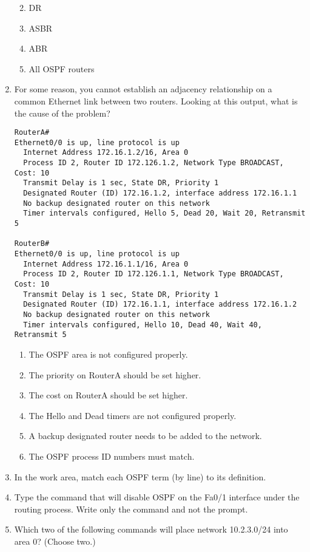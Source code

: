 \begin{enumerate}
  \begin{enumerate}
  \def\labelenumii{\Alph{enumii}.}
  \tightlist
  \item
    DR
  \item
    ASBR
  \item
    \protect\hypertarget{c18.xhtmlux5cux23Page_779}{}{}ABR
  \item
    All OSPF routers
  \end{enumerate}
\item
  For some reason, you cannot establish an adjacency relationship on a
  common Ethernet link between two routers. Looking at this output, what
  is the cause of the problem?

\begin{verbatim}
RouterA#
Ethernet0/0 is up, line protocol is up
  Internet Address 172.16.1.2/16, Area 0
  Process ID 2, Router ID 172.126.1.2, Network Type BROADCAST, Cost: 10
  Transmit Delay is 1 sec, State DR, Priority 1
  Designated Router (ID) 172.16.1.2, interface address 172.16.1.1
  No backup designated router on this network
  Timer intervals configured, Hello 5, Dead 20, Wait 20, Retransmit 5
 
RouterB#
Ethernet0/0 is up, line protocol is up
  Internet Address 172.16.1.1/16, Area 0
  Process ID 2, Router ID 172.126.1.1, Network Type BROADCAST, Cost: 10
  Transmit Delay is 1 sec, State DR, Priority 1
  Designated Router (ID) 172.16.1.1, interface address 172.16.1.2
  No backup designated router on this network
  Timer intervals configured, Hello 10, Dead 40, Wait 40, Retransmit 5
\end{verbatim}

  \begin{enumerate}
  \def\labelenumii{\Alph{enumii}.}
  \tightlist
  \item
    The OSPF area is not configured properly.
  \item
    The priority on RouterA should be set higher.
  \item
    The cost on RouterA should be set higher.
  \item
    The Hello and Dead timers are not configured properly.
  \item
    A backup designated router needs to be added to the network.
  \item
    The OSPF process ID numbers must match.
  \end{enumerate}
\item
  In the work area, match each OSPF term (by line) to its definition.

  \begin{figure}
  \centering
  \caption{}
  \end{figure}
\item
  Type the command that will disable OSPF on the Fa0/1 interface under
  the routing process. Write only the command and not the prompt.
\item
  \protect\hypertarget{c18.xhtmlux5cux23Page_780}{}{}Which two of the
  following commands will place network 10.2.3.0/24 into area 0? (Choose
  two.)


\end{enumerate}
